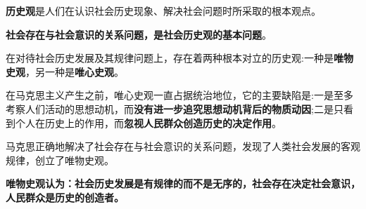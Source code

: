 \textbf{{历史观}}是人们在认识社会历史现象、解决社会问题时所采取的根本观点。

\textbf{{社会存在与社会意识的关系问题，是社会历史观的基本问题}}。

在对待社会历史发展及其规律问题上，存在着两种根本对立的历史观:一种是\textbf{{唯物史观}}，另一种是\textbf{{唯心史观}}。

在马克思主义产生之前，唯心史观一直占据统治地位，它的主要缺陷是:一是至多考察人们活动的思想动机，而\textbf{{没有进一步追究思想动机背后的物质动因}};二是只看到个人在历史上的作用，而\textbf{{忽视人民群众创造历史的决定作用}}。

马克思正确地解决了社会存在与社会意识的关系问题，发现了人类社会发展的客观规律，创立了唯物史观。

\textbf{{唯物史观认为}{：社会历史发展是有规律的而不是无序的，社会存在决定社会意识，人民群众是历史的创造者。}}

